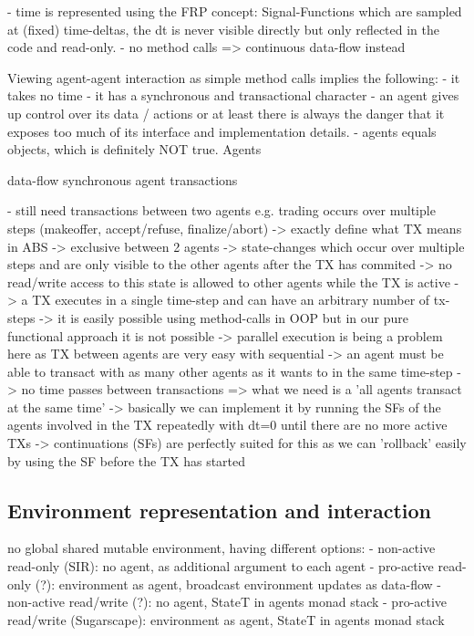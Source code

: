 - time is represented using the FRP concept: Signal-Functions which are sampled at (fixed) time-deltas, the dt is never visible directly but only reflected in the code and read-only.
- no method calls => continuous data-flow instead
	
Viewing agent-agent interaction as simple method calls implies the following:
- it takes no time
- it has a synchronous and transactional character
- an agent gives up control over its data / actions or at least there is always the danger that it exposes too much of its interface and implementation details. 
- agents equals objects, which is definitely NOT true. Agents 

data-flow
synchronous agent transactions

- still need transactions between two agents e.g. trading occurs over multiple steps (makeoffer, accept/refuse, finalize/abort) 
		-> exactly define what TX means in ABS
			-> exclusive between 2 agents
			-> state-changes which occur over multiple steps and are only visible to the other agents after the TX has commited
			-> no read/write access to this state is allowed to other agents while the TX is active
			-> a TX executes in a single time-step and can have an arbitrary number of tx-steps
		-> it is easily possible using method-calls in OOP but in our pure functional approach it is not possible
		-> parallel execution is being a problem here as TX between agents are very easy with sequential
		-> an agent must be able to transact with as many other agents as it wants to in the same time-step
		-> no time passes between transactions
		=> what we need is a 'all agents transact at the same time'
			-> basically we can implement it by running the SFs of the agents involved in the TX repeatedly with dt=0 until there are no more active TXs
			-> continuations (SFs) are perfectly suited for this as we can 'rollback' easily by using the SF before the TX has started
		
\subsection{Environment representation and interaction}

no global shared mutable environment, having different options:
- non-active read-only (SIR): no agent, as additional argument to each agent
- pro-active read-only (?): environment as agent, broadcast environment updates as data-flow
- non-active read/write (?): no agent, StateT in agents monad stack
- pro-active read/write (Sugarscape): environment as agent, StateT in agents monad stack

